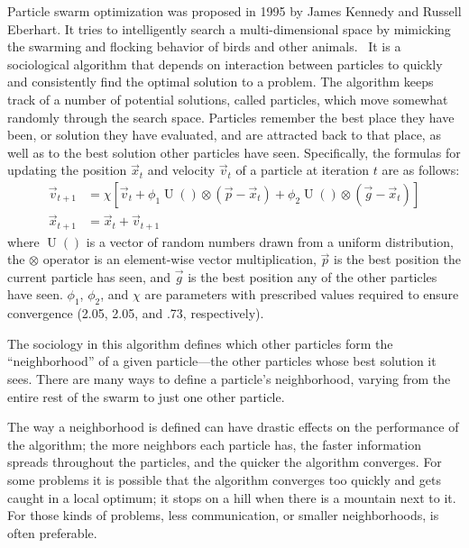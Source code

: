 \documentclass[onecolumn, 12pt]{article}
\DeclareMathOperator{\URand}{U}
\providecommand{\ppos}{\ensuremath{\Vec{x}}}
\providecommand{\pvel}{\ensuremath{\Vec{v}}}
\providecommand{\gbest}{\ensuremath{\Vec{g}}}
\providecommand{\pbest}{\ensuremath{\Vec{p}}}
\providecommand{\constriction}{\ensuremath{\chi}}
\providecommand{\coeff}{\ensuremath{\phi}}
\begin{document}
Particle swarm optimization was proposed in 1995 by James Kennedy and Russell
Eberhart.  It tries to intelligently search a multi-dimensional space by
mimicking the swarming and flocking behavior of birds and other
animals.~\cite{kennedy-icnn95} It is a sociological algorithm that depends on
interaction between particles to quickly and consistently find the optimal
solution to a problem.  The algorithm keeps track of a number of potential
solutions, called particles, which move somewhat randomly through the search
space.  Particles remember the best place they have been, or solution they have
evaluated, and are attracted back to that place, as well as to the best
solution other particles have seen.  Specifically, the formulas for updating
the position $\ppos_t$ and velocity $\pvel_t$ of a particle at iteration $t$ are
as follows:
\begin{align}
\label{eq:velupdate}
	\pvel_{t+1} &=
		\constriction \left[ \pvel_t +
			\coeff_1\URand()\otimes(\pbest - \ppos_t) +
			\coeff_2\URand()\otimes(\gbest - \ppos_t)
		\right] \\
\label{eq:posupdate}
	\ppos_{t+1} &= \ppos_t + \pvel_{t+1}
\end{align}
where \( \URand() \) is a vector of random numbers drawn from a uniform
distribution, the \( \otimes \) operator is an element-wise vector
multiplication, $\pbest$ is the best position the current particle has seen,
and $\gbest$ is the best position any of the other particles have seen.  \(
\coeff_1 \), \( \coeff_2 \), and \( \constriction \) are parameters with
prescribed values required to ensure convergence (2.05, 2.05, and .73,
respectively).~\cite{clerc-tec02}~\cite{poli-aea08}

The sociology in this algorithm defines which other particles form the
``neighborhood'' of a given particle---the other particles whose best solution
it sees.  There are many ways to define a particle's neighborhood, varying from
the entire rest of the swarm to just one other particle.  

The way a neighborhood is defined can have drastic effects on the performance
of the algorithm; the more neighbors each particle has, the faster information
spreads throughout the particles, and the quicker the algorithm converges.  For
some problems it is possible that the algorithm converges too quickly and gets
caught in a local optimum; it stops on a hill when there is a mountain next to
it.  For those kinds of problems, less communication, or smaller neighborhoods,
is often preferable.
\end{document}
